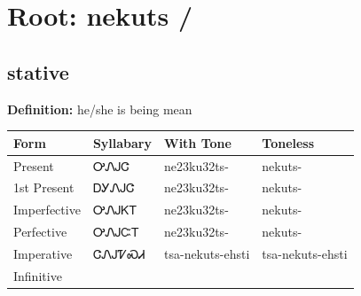\documentclass{article}%
\begin{document}
%
\normalsize%
\section*{Root: nekuts / }%
\subsection*{stative}%
\textbf{Definition: }%
he/she is being mean%
\\[0.5em]%
\begin{tabular}{|l|l|l|l|}%
\hline%
\textbf{Form}&\textbf{Syllabary}&\textbf{With Tone}&\textbf{Toneless}\\%
\hline%
Present&ᎤᏁᎫᏣ&ne23ku32ts{-}&nekuts{-}\\%
1st Present&ᎠᎩᏁᎫᏣ&ne23ku32ts{-}&nekuts{-}\\%
Imperfective&ᎤᏁᎫᏦᎢ&ne23ku32ts{-}&nekuts{-}\\%
Perfective&ᎤᏁᎫᏨᎢ&ne23ku32ts{-}&nekuts{-}\\%
Imperative&ᏣᏁᎫᏤᏍᏗ&tsa{-}nekuts{-}ehsti&tsa{-}nekuts{-}ehsti\\%
Infinitive&&&\\%
\hline%
\end{tabular}%
\\[1em]%
\end{document}
